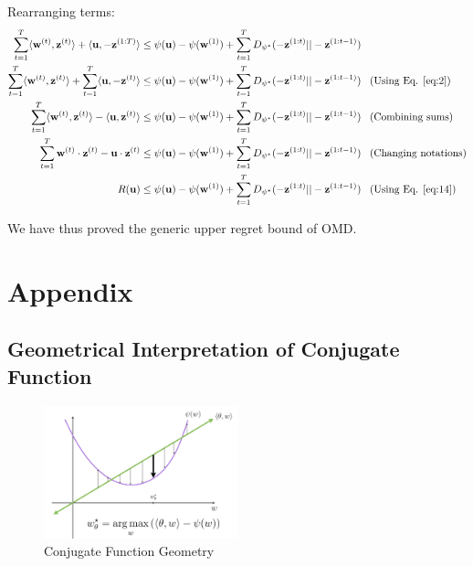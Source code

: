 \documentclass[11pt]{article}
\begin{document}
{Rearranging terms:
\begin{align*}
 \sum_{t=1}^{T}\langle \textbf{w}^{(t)}, \textbf{z}^{(t)} \rangle + \langle \textbf{u}, -\textbf{z}^{(1:T)} \rangle &\leq \psi(\textbf{u}) -\psi(\textbf{w}^{(1)}) +\sum_{t=1}^{T} D_{\psi^{*}}(-\textbf{z}^{(1:t)}||-\textbf{z}^{(1:t-1)})\\
  \sum_{t=1}^{T}\langle \textbf{w}^{(t)}, \textbf{z}^{(t)} \rangle + \sum_{t=1}^{T}\langle \textbf{u}, -\textbf{z}^{(t)} \rangle &\leq \psi(\textbf{u}) -\psi(\textbf{w}^{(1)}) +\sum_{t=1}^{T} D_{\psi^{*}}(-\textbf{z}^{(1:t)}||-\textbf{z}^{(1:t-1)}) \;\;\; (\text{Using Eq. \ref{eq:2}})\\
  \sum_{t=1}^{T}\langle \textbf{w}^{(t)}, \textbf{z}^{(t)} \rangle - \langle \textbf{u}, \textbf{z}^{(t)} \rangle &\leq \psi(\textbf{u}) -\psi(\textbf{w}^{(1)}) +\sum_{t=1}^{T} D_{\psi^{*}}(-\textbf{z}^{(1:t)}||-\textbf{z}^{(1:t-1)}) \;\;\; (\text{Combining sums})\\
    \sum_{t=1}^{T}\textbf{w}^{(t)} \cdot \textbf{z}^{(t)} - \textbf{u} \cdot \textbf{z}^{(t)} &\leq \psi(\textbf{u}) -\psi(\textbf{w}^{(1)}) +\sum_{t=1}^{T} D_{\psi^{*}}(-\textbf{z}^{(1:t)}||-\textbf{z}^{(1:t-1)}) \;\;\; (\text{Changing notations})\\
    R(\textbf{u}) &\leq \psi(\textbf{u}) -\psi(\textbf{w}^{(1)}) +\sum_{t=1}^{T} D_{\psi^{*}}(-\textbf{z}^{(1:t)}||-\textbf{z}^{(1:t-1)}) \;\;\; (\text{Using Eq. \ref{eq:14}})\\
\end{align*}

We have thus proved the generic upper regret bound of OMD. 


}
\section{Appendix}

\subsection{Geometrical Interpretation of Conjugate Function}

\begin{figure}[H]
    \centering
    \includegraphics[width=0.5\textwidth]{figs/conjugate-geometry.png}
    \caption{Conjugate Function Geometry}
    \label{fig:conj}
\end{figure}
\end{document}
